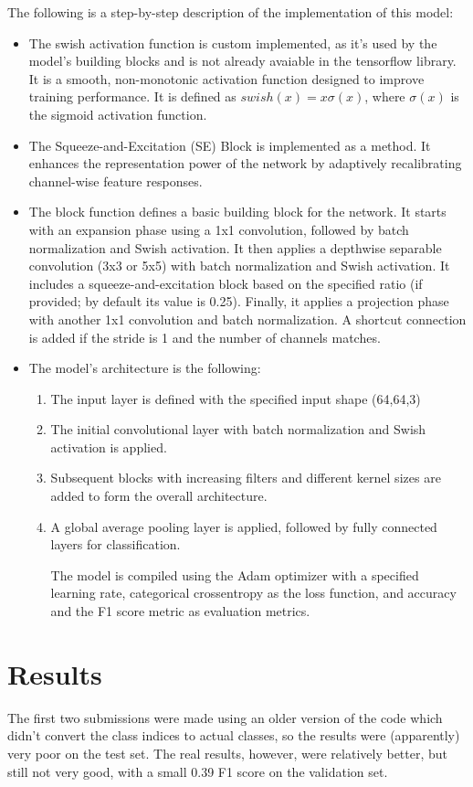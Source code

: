 \documentclass{article}
\begin{document}
The following is a step-by-step description of the implementation of this model:
\begin{itemize}
\item The swish activation function is custom implemented, as it's used by the model's building blocks and is not already avaiable in the tensorflow library. It is a smooth, non-monotonic activation function designed to improve training performance. It is defined as $swish(x)=x\sigma(x)$, where $\sigma(x)$ is the sigmoid activation function.
\item The Squeeze-and-Excitation (SE) Block is implemented as a method. It enhances the representation power of the network by adaptively recalibrating channel-wise feature responses.
\item The block function defines a basic building block for the network. It starts with an expansion phase using a 1x1 convolution, followed by batch normalization and Swish activation. It then applies a depthwise separable convolution (3x3 or 5x5) with batch normalization and Swish activation. It includes a squeeze-and-excitation block based on the specified ratio (if provided; by default its value is 0.25). Finally, it applies a projection phase with another 1x1 convolution and batch normalization.
A shortcut connection is added if the stride is 1 and the number of channels matches.
\item The model's architecture is the following:
\begin{enumerate}
\item The input layer is defined with the specified input shape (64,64,3)
\item The initial convolutional layer with batch normalization and Swish activation is applied.
\item Subsequent blocks with increasing filters and different kernel sizes are added to form the overall architecture.
\item A global average pooling layer is applied, followed by fully connected layers for classification.

The model is compiled using the Adam optimizer with a specified learning rate, categorical crossentropy as the loss function, and accuracy and the F1 score metric as evaluation metrics.
\end{enumerate}
\end{itemize}

\section{Results}
The first two submissions were made using an older version of the code which didn't convert the class indices to actual classes, so the results were (apparently) very poor on the test set. The real results, however, were relatively better, but still not very good, with a small 0.39 F1 score on the validation set.
\end{document}
